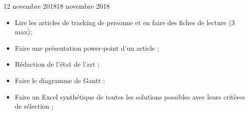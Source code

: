\documentclass[12pt]{fiche-rd-info}
\begin{document}
\begin{fichesuivi}{12 novembre 2018}{18 novembre 2018}
	\begin{planification}
		\begin{itemize}
			\item Lire les articles de tracking de personne et en faire des fiches de lecture (3 max);
			\item Faire une présentation power-point d'un article ;
			\item Rédaction de l'état de l'art ;
			\item Faire le diagramme de Gantt ;
			\item Faire un Excel synthétique de toutes les solutions possibles avec leurs critères de sélection ;
		\end{itemize}
	\end{planification}
\end{fichesuivi}
\end{document}
